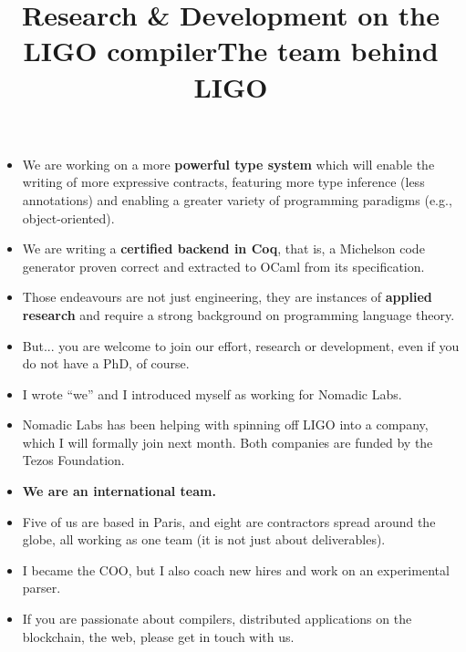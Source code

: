 \documentclass[wide]{slides}
\begin{document}
\begin{slide}
  \title{Research \& Development on the LIGO compiler}

  \begin{itemize}

    \item We are working on a more \textbf{powerful type system} which
      will enable the writing of more expressive contracts, featuring
      more type inference (less annotations) and enabling a greater
      variety of programming paradigms (e.g., object-oriented).


    \item We are writing a \textbf{certified backend in Coq}, that is,
      a Michelson code generator proven correct and extracted to OCaml
      from its specification.

    \item Those endeavours are not just engineering, they are
      instances of \textbf{applied research} and require a strong
      background on programming language theory.

    \item But... you are welcome to join our effort, research or
      development, even if you do not have a PhD, of course.

  \end{itemize}

\end{slide}

\begin{slide}
  \title{The team behind LIGO}
  \begin{itemize}

    \item I wrote ``we'' and I introduced myself as working for
      Nomadic Labs.

    \item Nomadic Labs has been helping with spinning off LIGO into a
      company, which I will formally join next month. Both companies
      are funded by the Tezos Foundation.

    \item \textbf{We are an international team.}

    \item Five of us are based in Paris, and eight are contractors
      spread around the globe, all working as one team (it is not just
      about deliverables).

    \item I became the COO, but I also coach new hires and work on an
      experimental parser.

    \item If you are passionate about compilers, distributed
      applications on the blockchain, the web, please get in touch
      with us.

  \end{itemize}

\end{slide}
\end{document}
